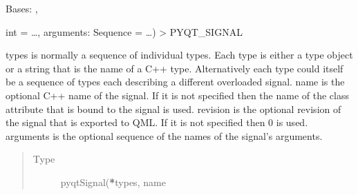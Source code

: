 \documentclass[letterpaper,10pt,english]{sphinxmanual}
\begin{document}
\begin{fulllineitems}
\label{\detokenize{NoSeMazeController/Windows:Windows.AppWindows.HardwareWindow}}
\pysigstartsignatures
{}
\pysigstopsignatures
\sphinxAtStartPar
Bases: , {\hyperref[\detokenize{NoSeMazeController/Designs:Designs.hardwareWindow.Ui_MainWindow}]{}}

\begin{fulllineitems}
\label{\detokenize{NoSeMazeController/Windows:Windows.AppWindows.HardwareWindow.change}}
\pysigstartsignatures
{}
\pysigstopsignatures
\end{fulllineitems}


\begin{fulllineitems}
\label{\detokenize{NoSeMazeController/Windows:Windows.AppWindows.HardwareWindow.closeEvent}}
\pysigstartsignatures
{}
\pysigstopsignatures
\end{fulllineitems}


\begin{fulllineitems}
\label{\detokenize{NoSeMazeController/Windows:Windows.AppWindows.HardwareWindow.new_pref}}
\pysigstartsignatures
{}
\pysigstopsignatures
\sphinxAtStartPar
int = …, arguments: Sequence = …) \sphinxhyphen{}\textgreater{} PYQT\_SIGNAL

\sphinxAtStartPar
types is normally a sequence of individual types.  Each type is either a
type object or a string that is the name of a C++ type.  Alternatively
each type could itself be a sequence of types each describing a different
overloaded signal.
name is the optional C++ name of the signal.  If it is not specified then
the name of the class attribute that is bound to the signal is used.
revision is the optional revision of the signal that is exported to QML.
If it is not specified then 0 is used.
arguments is the optional sequence of the names of the signal’s arguments.
\begin{quote}\begin{description}
\item[{Type}] \leavevmode
\sphinxAtStartPar
pyqtSignal({\color{red}\bfseries{}*}types, name


\end{description}
\end{quote}
\end{fulllineitems}
\end{fulllineitems}
\end{document}
